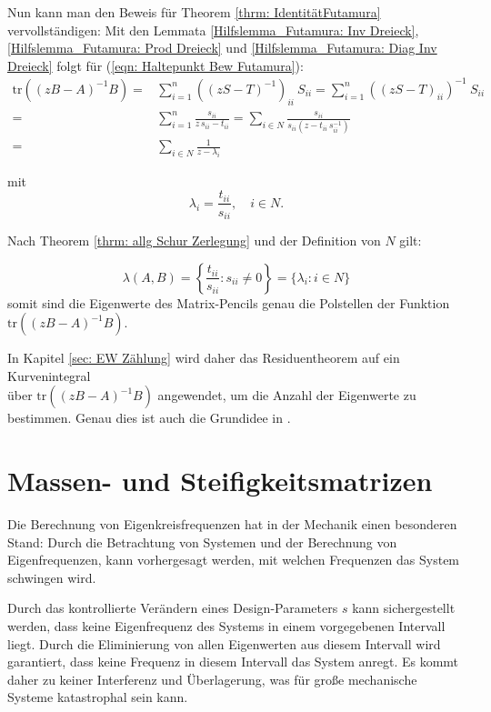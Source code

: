 \documentclass[a4paper,12pt]{report}
\newcommand{\tr}{\text{tr}}
\newcommand{\inv}{^{-1}}
\newcommand{\1}{\mathds{1}}
\theoremstyle{plain} %
\theoremstyle{definition} %
\theoremstyle{remark}
\begin{document}
            Nun kann man den Beweis für Theorem \ref{thrm: IdentitätFutamura} vervollständigen:
            Mit den Lemmata \ref{Hilfslemma_Futamura: Inv Dreieck}, \ref{Hilfslemma_Futamura: Prod Dreieck} und \ref{Hilfslemma_Futamura: Diag Inv Dreieck} folgt für (\ref{eqn: Haltepunkt Bew Futamura}):
            \begin{align*}
                  \tr((zB-A)\inv B) =& \sum_{i=1}^{n}((zS-T)\inv)_{ii}\ S_{ii} = \sum_{i=1}^{n}((zS-T)_{ii})\inv\ S_{ii}\\
                  =& \sum_{i=1}^{n}\frac{s_{ii}}{z\,s_{ii}-t_{ii}} = \sum_{i\in N}\frac{s_{ii}}{s_{ii}(z-t_{ii}\, s_{ii}\inv)}\\
                  =& \sum_{i\in N} \frac{1}{z-\lambda_i}
            \end{align*}

            mit
            $$\lambda_i = \frac{t_{ii}}{s_{ii}},\quad i\in N.$$

            Nach Theorem \ref{thrm: allg Schur Zerlegung} und der Definition von $N$ gilt:

            $$\lambda(A, B) = \left\{\frac{t_{ii}}{s_{ii}} : s_{ii}\ne 0\right\} = \{\lambda_i: i\in N\}$$
            somit sind die Eigenwerte des Matrix-Pencils genau die Polstellen der Funktion $\tr((zB-A)\inv B)$.

            In Kapitel \ref{sec: EW Zählung} wird daher das Residuentheorem auf ein Kurvenintegral\\
            über $\tr((zB-A)\inv B)$ angewendet, um die Anzahl der Eigenwerte zu bestimmen.
            Genau dies ist auch die Grundidee in \cite{grundlageFutamura,hauptteilTkachuk}.

            
\chapter{Massen- und Steifigkeitsmatrizen}
\label{sec: MS Matrizen}
      Die Berechnung von Eigenkreisfrequenzen hat in der Mechanik einen besonderen Stand:
      Durch die Betrachtung von Systemen und der Berechnung von Eigenfrequenzen, kann vorhergesagt werden, mit welchen Frequenzen das System schwingen wird.

      Durch das kontrollierte Verändern eines Design-Parameters $s$ kann sichergestellt werden, dass keine Eigenfrequenz des Systems in einem vorgegebenen Intervall liegt.
      Durch die Eliminierung von allen Eigenwerten aus diesem Intervall wird garantiert, dass keine Frequenz in diesem Intervall das System anregt.
      Es kommt daher zu keiner Interferenz und Überlagerung, was für große mechanische Systeme katastrophal sein kann.
\end{document}
